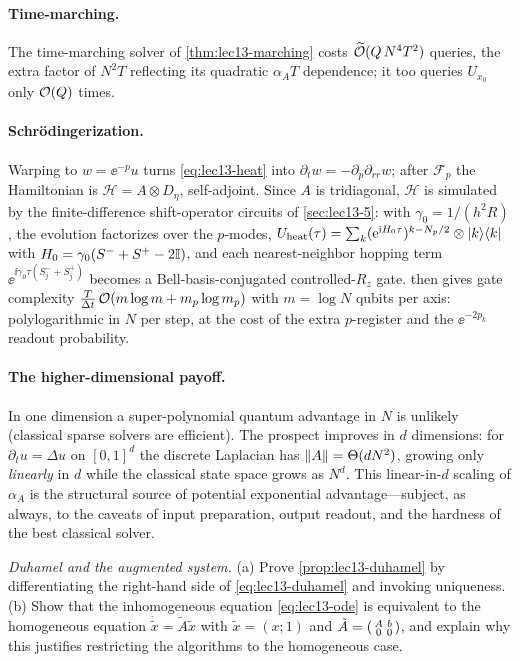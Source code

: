 \paragraph{Time-marching.}
The time-marching solver of \cref{thm:lec13-marching} costs $\widetilde{\mathcal{O}}(Q\,N^4 T^2)$
queries, the extra factor of $N^2 T$ reflecting its quadratic $\alpha_A T$ dependence; it too
queries $U_{x_0}$ only $\mathcal{O}(Q)$ times.

\paragraph{Schr\"odingerization.}
Warping to $w=\ee^{-p}u$ turns \eqref{eq:lec13-heat} into $\partial_t w=-\partial_p\partial_{rr}w$;
after $\mathcal F_p$ the Hamiltonian is $\mathcal H=A\otimes D_\eta$, self-adjoint. Since $A$ is
tridiagonal, $\mathcal H$ is simulated by the finite-difference shift-operator circuits of
\cref{sec:lec13-5}: with $\gamma_0=1/(h^2 R)$, the evolution factorizes over the $p$-modes,
$U_{\mathrm{heat}}(\tau)=\sum_k(\mathrm{e}^{\mathrm{i} H_0\tau})^{k-N_p/2}\otimes\ket{k}\!\bra{k}$ with
$H_0=\gamma_0(S^-+S^+-2\mathbb{I})$, and each nearest-neighbor hopping term $\ee^{\ii\gamma_0\tau(S_j^-
+S_j^+)}$ becomes a Bell-basis-conjugated controlled-$R_z$ gate. 
then gives gate complexity $\tfrac{T}{\Delta t}\,\mathcal{O}(m\log m+m_p\log m_p)$ with $m=\log N$
qubits per axis: polylogarithmic in $N$ per step, at the cost of the extra $p$-register and the
$\ee^{-2p_k}$ readout probability.

\paragraph{The higher-dimensional payoff.}
In one dimension a super-polynomial quantum advantage in $N$ is unlikely (classical sparse
solvers are efficient). The prospect improves in $d$ dimensions: for $\partial_t u=\Delta u$ on
$[0,1]^d$ the discrete Laplacian has $\left\lVert A \right\rVert=\Theta(dN^2)$, growing only \emph{linearly} in $d$
while the classical state space grows as $N^d$. This linear-in-$d$ scaling of $\alpha_A$ is the
structural source of potential exponential advantage---subject, as always, to the caveats of
input preparation, output readout, and the hardness of the best classical solver.

\exercisesection

\begin{exercise}\label{ex:lec13-1}
\emph{Duhamel and the augmented system.} (a) Prove \cref{prop:lec13-duhamel} by differentiating
the right-hand side of \eqref{eq:lec13-duhamel} and invoking uniqueness. (b) Show that the
inhomogeneous equation \eqref{eq:lec13-ode} is equivalent to the homogeneous equation
$\dot{\tilde x}=\tilde A\tilde x$ with $\tilde x=(x;1)$ and
$\tilde A=\begin{psmallmatrix}A&b\\0&0\end{psmallmatrix}$, and explain why this justifies
restricting the algorithms to the homogeneous case.
\end{exercise}

